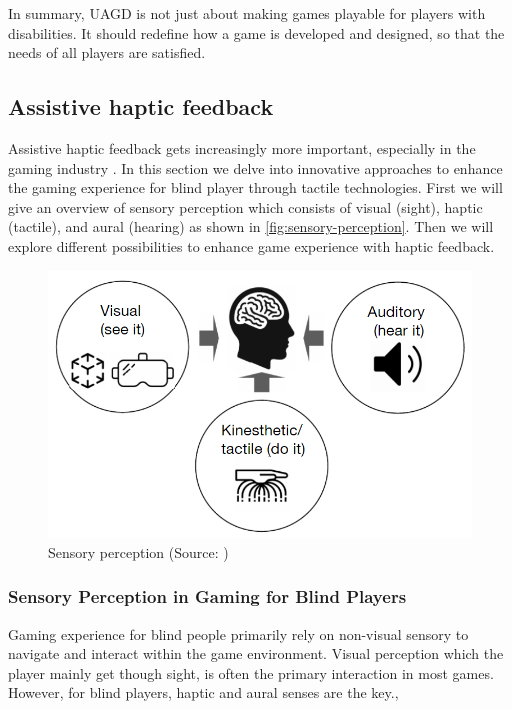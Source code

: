 \documentclass[sigconf,natbib=false,10pt]{acmart}
\begin{document}
	In summary, UAGD is not just about making games playable for players with disabilities.
	It should redefine how a game is developed and designed, so that the needs of all players are satisfied.
	
	\subsection{Assistive haptic feedback} \label{subsec:assistiveHapticFeedback}
	Assistive haptic feedback gets increasingly more important, especially in the gaming industry \cite{kuber_towards_2007}.
	In this section we delve into innovative approaches to enhance the gaming experience for blind player through tactile technologies.
	First we will give an overview of sensory perception which consists of visual (sight), haptic (tactile), and aural (hearing) as shown in \autoref{fig:sensory-perception}.
	Then we will explore different possibilities to enhance game experience with haptic feedback.
	
	\begin{figure}[ht]
		\centering
		\includegraphics[scale=0.4]{assets/sensory-perception.png}
		\caption{Sensory perception (Source: \textcite{sanfilippo_perspective_2022})}
		\label{fig:sensory-perception}
	\end{figure}
	
	\subsubsection{Sensory Perception in Gaming for Blind Players}
	Gaming experience for blind people primarily rely on non-visual sensory to navigate and interact within the game environment.
	Visual perception which the player mainly get though sight, is often the primary interaction in most games.
	However, for blind players, haptic and aural senses are the key.,
	
\end{document}
